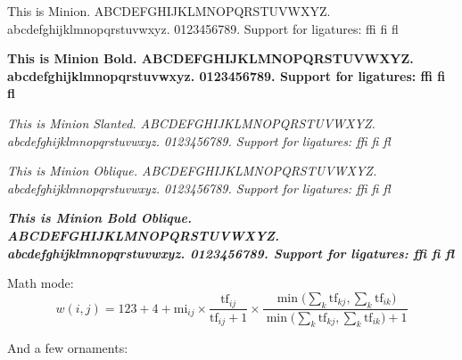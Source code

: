 \documentclass[10pt]{article}
\begin{document}
\thispagestyle{empty}

\noindent%
This is Minion. ABCDEFGHIJKLMNOPQRSTUVWXYZ. 
abcdefghijklmnopqrstuvwxyz. 0123456789.
Support for ligatures: ffi fi fl

\noindent\textbf{%
This is Minion Bold. ABCDEFGHIJKLMNOPQRSTUVWXYZ. 
abcdefghijklmnopqrstuvwxyz. 0123456789.
Support for ligatures: ffi fi fl
}

\noindent\textsl{%
This is Minion Slanted. ABCDEFGHIJKLMNOPQRSTUVWXYZ. 
abcdefghijklmnopqrstuvwxyz. 0123456789.
Support for ligatures: ffi fi fl
}

\noindent\textit{%
This is Minion Oblique. ABCDEFGHIJKLMNOPQRSTUVWXYZ. 
abcdefghijklmnopqrstuvwxyz. 0123456789.
Support for ligatures: ffi fi fl
}

\noindent\textit{\textbf{%
This is Minion Bold Oblique. ABCDEFGHIJKLMNOPQRSTUVWXYZ. 
abcdefghijklmnopqrstuvwxyz. 0123456789.
Support for ligatures: ffi fi fl
}}

\noindent
Math mode:
\begin{equation}
w(i,j) = 123 + 4 + \mathrm{mi}_{ij} \times 
         \frac{\mathrm{tf}_{ij}}{\mathrm{tf}_{ij} + 1} \times 
         \frac{\min\Big(\sum\limits_{k}^{}\mathrm{tf}_{kj},
                    \sum\limits_{k}^{}\mathrm{tf}_{ik}\Big)}
              {\min\Big(\sum\limits_{k}^{}\mathrm{tf}_{kj},
                    \sum\limits_{k}^{}\mathrm{tf}_{ik}\Big) + 1}
\end{equation}

\noindent
And a few ornaments: 
 
\end{document}
